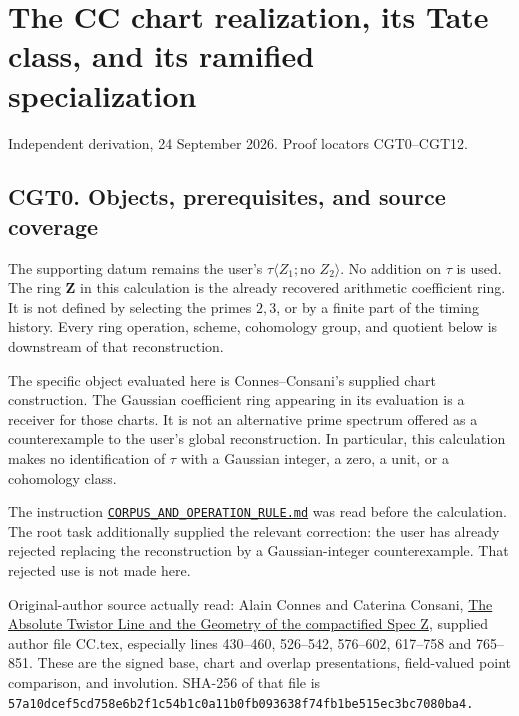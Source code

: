 \section{The CC chart realization, its Tate class, and its ramified
specialization}\label{the-cc-chart-realization-its-tate-class-and-its-ramified-specialization}

Independent derivation, 24 September 2026. Proof locators CGT0--CGT12.

\subsection{CGT0. Objects, prerequisites, and source
coverage}\label{cgt0.-objects-prerequisites-and-source-coverage}

The supporting datum remains the user's
\(\tau\langle Z_1;\text{no }Z_2\rangle\). No addition on \(\tau\) is
used. The ring \(\mathbf Z\) in this calculation is the already
recovered arithmetic coefficient ring. It is not defined by selecting
the primes \(2,3\), or by a finite part of the timing history. Every
ring operation, scheme, cohomology group, and quotient below is
downstream of that reconstruction.

The specific object evaluated here is Connes--Consani's supplied chart
construction. The Gaussian coefficient ring appearing in its evaluation
is a receiver for those charts. It is not an alternative prime spectrum
offered as a counterexample to the user's global reconstruction. In
particular, this calculation makes no identification of \(\tau\) with a
Gaussian integer, a zero, a unit, or a cohomology class.

The instruction
\href{https://github.com/KokunoYumeto/zeta-function-research-reader/blob/96b02efaf4511d07f33de5ea4cfb10058e905d7e/workbenches/splitzero-tandem/continuations/20260924-cohomology-weight-and-character-lifts/original-character-lifting/foundations/user_definitions_20260924/SOURCE_OPERATIONS_AND_PROOFS.md}{\nolinkurl{CORPUS_AND_OPERATION_RULE.md}}
was read before the calculation. The root task additionally supplied the
relevant correction: the user has already rejected replacing the
reconstruction by a Gaussian-integer counterexample. That rejected use
is not made here.

Original-author source actually read: Alain Connes and Caterina Consani,
\href{https://arxiv.org/html/2609.00299v1}{The Absolute Twistor Line and
the Geometry of the compactified Spec Z}, supplied author file CC.tex,
especially lines 430--460, 526--542, 576--602, 617--758 and 765--851.
These are the signed base, chart and overlap presentations, field-valued
point comparison, and involution. SHA-256 of that file is
\nolinkurl{57a10dcef5cd758e6b2f1c54b1c0a11b0fb093638f74fb1be515ec3bc7080ba4.}

